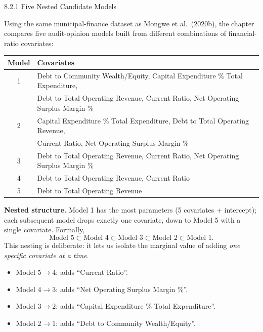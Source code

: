 \documentclass[aspectratio=169,10pt]{beamer}
\begin{document}
\begin{frame}[allowframebreaks]{8.2.1 Five Nested Candidate Models}

Using the same municipal-finance dataset as Mongwe et al.\ (2020b), the chapter compares five audit-opinion models built from different combinations of financial-ratio covariates:

\begin{table}
\centering\scriptsize
\begin{tabular}{cl}
\toprule
Model & Covariates \\
\midrule
1 & Debt to Community Wealth/Equity, Capital Expenditure \% Total Expenditure,\\
  & Debt to Total Operating Revenue, Current Ratio, Net Operating Surplus Margin \%\\
2 & Capital Expenditure \% Total Expenditure, Debt to Total Operating Revenue,\\
  & Current Ratio, Net Operating Surplus Margin \%\\
3 & Debt to Total Operating Revenue, Current Ratio, Net Operating Surplus Margin \%\\
4 & Debt to Total Operating Revenue, Current Ratio\\
5 & Debt to Total Operating Revenue\\
\bottomrule
\end{tabular}
\end{table}

\framebreak

\textbf{Nested structure.} Model 1 has the most parameters (5 covariates + intercept); each subsequent model drops exactly one covariate, down to Model 5 with a single covariate. Formally,
\[
\text{Model 5} \subset \text{Model 4} \subset \text{Model 3} \subset \text{Model 2} \subset \text{Model 1}.
\]
This nesting is deliberate: it lets us isolate the marginal value of adding \emph{one specific covariate at a time}.
\begin{itemize}
  \item Model $5 \to 4$: adds ``Current Ratio''.
  \item Model $4 \to 3$: adds ``Net Operating Surplus Margin \%''.
  \item Model $3 \to 2$: adds ``Capital Expenditure \% Total Expenditure''.
  \item Model $2 \to 1$: adds ``Debt to Community Wealth/Equity''.
\end{itemize}

\end{frame}
\end{document}
